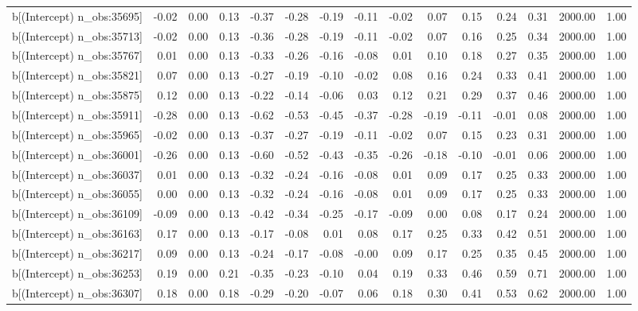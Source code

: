 \begin{table}[ht]
\begin{tabular}{rrrrrrrrrrrrrrr}
  b[(Intercept) n\_obs:35695] & -0.02 & 0.00 & 0.13 & -0.37 & -0.28 & -0.19 & -0.11 & -0.02 & 0.07 & 0.15 & 0.24 & 0.31 & 2000.00 & 1.00 \\ 
  b[(Intercept) n\_obs:35713] & -0.02 & 0.00 & 0.13 & -0.36 & -0.28 & -0.19 & -0.11 & -0.02 & 0.07 & 0.16 & 0.25 & 0.34 & 2000.00 & 1.00 \\ 
  b[(Intercept) n\_obs:35767] & 0.01 & 0.00 & 0.13 & -0.33 & -0.26 & -0.16 & -0.08 & 0.01 & 0.10 & 0.18 & 0.27 & 0.35 & 2000.00 & 1.00 \\ 
  b[(Intercept) n\_obs:35821] & 0.07 & 0.00 & 0.13 & -0.27 & -0.19 & -0.10 & -0.02 & 0.08 & 0.16 & 0.24 & 0.33 & 0.41 & 2000.00 & 1.00 \\ 
  b[(Intercept) n\_obs:35875] & 0.12 & 0.00 & 0.13 & -0.22 & -0.14 & -0.06 & 0.03 & 0.12 & 0.21 & 0.29 & 0.37 & 0.46 & 2000.00 & 1.00 \\ 
  b[(Intercept) n\_obs:35911] & -0.28 & 0.00 & 0.13 & -0.62 & -0.53 & -0.45 & -0.37 & -0.28 & -0.19 & -0.11 & -0.01 & 0.08 & 2000.00 & 1.00 \\ 
  b[(Intercept) n\_obs:35965] & -0.02 & 0.00 & 0.13 & -0.37 & -0.27 & -0.19 & -0.11 & -0.02 & 0.07 & 0.15 & 0.23 & 0.31 & 2000.00 & 1.00 \\ 
  b[(Intercept) n\_obs:36001] & -0.26 & 0.00 & 0.13 & -0.60 & -0.52 & -0.43 & -0.35 & -0.26 & -0.18 & -0.10 & -0.01 & 0.06 & 2000.00 & 1.00 \\ 
  b[(Intercept) n\_obs:36037] & 0.01 & 0.00 & 0.13 & -0.32 & -0.24 & -0.16 & -0.08 & 0.01 & 0.09 & 0.17 & 0.25 & 0.33 & 2000.00 & 1.00 \\ 
  b[(Intercept) n\_obs:36055] & 0.00 & 0.00 & 0.13 & -0.32 & -0.24 & -0.16 & -0.08 & 0.01 & 0.09 & 0.17 & 0.25 & 0.33 & 2000.00 & 1.00 \\ 
  b[(Intercept) n\_obs:36109] & -0.09 & 0.00 & 0.13 & -0.42 & -0.34 & -0.25 & -0.17 & -0.09 & 0.00 & 0.08 & 0.17 & 0.24 & 2000.00 & 1.00 \\ 
  b[(Intercept) n\_obs:36163] & 0.17 & 0.00 & 0.13 & -0.17 & -0.08 & 0.01 & 0.08 & 0.17 & 0.25 & 0.33 & 0.42 & 0.51 & 2000.00 & 1.00 \\ 
  b[(Intercept) n\_obs:36217] & 0.09 & 0.00 & 0.13 & -0.24 & -0.17 & -0.08 & -0.00 & 0.09 & 0.17 & 0.25 & 0.35 & 0.45 & 2000.00 & 1.00 \\ 
  b[(Intercept) n\_obs:36253] & 0.19 & 0.00 & 0.21 & -0.35 & -0.23 & -0.10 & 0.04 & 0.19 & 0.33 & 0.46 & 0.59 & 0.71 & 2000.00 & 1.00 \\ 
  b[(Intercept) n\_obs:36307] & 0.18 & 0.00 & 0.18 & -0.29 & -0.20 & -0.07 & 0.06 & 0.18 & 0.30 & 0.41 & 0.53 & 0.62 & 2000.00 & 1.00 \\ 

\end{tabular}
\end{table}

